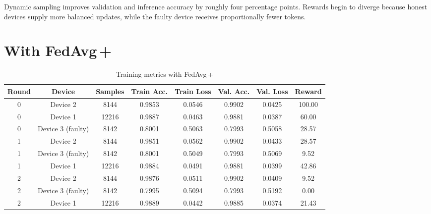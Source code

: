 Dynamic sampling improves validation and inference accuracy by roughly four percentage points. Rewards begin to diverge because honest devices supply more balanced updates, while the faulty device receives proportionally fewer tokens.

\section{With FedAvg\,+ }

\begin{table}[h!]
    \centering
    \caption{Training metrics with FedAvg\,+}
    \label{tab:fedavg_plus}
    \begin{tabular}{c c c c c c c c}
        \toprule
        \textbf{Round} & \textbf{Device} & \textbf{Samples} & \textbf{Train Acc.} & \textbf{Train Loss} & \textbf{Val. Acc.} & \textbf{Val. Loss} & \textbf{Reward} \\
        \midrule
        0 & Device 2 & 8144 & 0.9853 & 0.0546 & 0.9902 & 0.0425 & 100.00 \\
        0 & Device 1 & 12216 & 0.9887 & 0.0463 & 0.9881 & 0.0387 & 60.00 \\
        0 & Device 3 (faulty) & 8142 & 0.8001 & 0.5063 & 0.7993 & 0.5058 & 28.57 \\
        1 & Device 2 & 8144 & 0.9851 & 0.0562 & 0.9902 & 0.0433 & 28.57 \\
        1 & Device 3 (faulty) & 8142 & 0.8001 & 0.5049 & 0.7993 & 0.5069 & 9.52 \\
        1 & Device 1 & 12216 & 0.9884 & 0.0491 & 0.9881 & 0.0399 & 42.86 \\
        2 & Device 2 & 8144 & 0.9876 & 0.0511 & 0.9902 & 0.0409 & 9.52 \\
        2 & Device 3 (faulty) & 8142 & 0.7995 & 0.5094 & 0.7993 & 0.5192 & 0.00 \\
        2 & Device 1 & 12216 & 0.9889 & 0.0442 & 0.9885 & 0.0374 & 21.43 \\
        \bottomrule
    \end{tabular}
\end{table}

